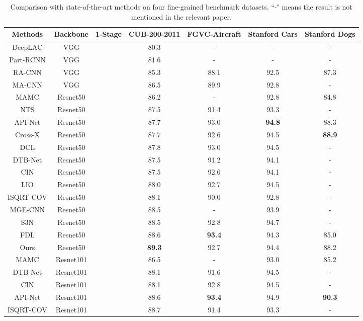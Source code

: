 \documentclass[conference]{IEEEtran}
\newcommand{\unchecked}{}
\begin{document}
	\begin{table*}
		\caption{Comparison with state-of-the-art methods on four fine-grained benchmark datasets. ``-" means the result is not mentioned in the relevant paper.}
		\label{table:COMP}
		\centering
		\begin{tabular}{ccccccc}
			\hline
			\textbf{Methods}       & \textbf{Backbone}     
			&\textbf{1-Stage} & \textbf{CUB-200-2011} & \textbf{FGVC-Aircraft} 
			& \textbf{Stanford Cars} & \textbf{Stanford Dogs} \\ \hline
			DeepLAC       & VGG   &\unchecked       & 80.3 & - &- &- \\
			Part-RCNN     & VGG   &\unchecked       & 81.6 & - &- &- \\
			RA-CNN        & VGG   &\unchecked     & 85.3   & 88.1 & 92.5 & 87.3 \\
			MA-CNN        & VGG   &\checked       & 86.5   & 89.9 & 92.8 & -  \\
			\hline
			MAMC          & Resnet50   &\checked       & 86.2   &- &92.8 & 84.8 \\
			NTS           & Resnet50   &\unchecked     & 87.5   & 91.4 & 93.3 &- \\
			API-Net       & Resnet50   &\checked       & 87.7   & 93.0 & \textbf{94.8} &88.3\\
			Cross-X       & Resnet50   &\checked       & 87.7   & 92.6 & 94.5 & \textbf{88.9}\\
			DCL           & Resnet50   &\checked       & 87.8   & 93.0 & 94.5 & -\\
			DTB-Net       & Resnet50   &\checked      & 87.5   & 91.2 & 94.1 & -\\
			CIN           & Resnet50   &\checked       & 87.5   & 92.6 & 94.1 & -\\
			LIO           & Resnet50   &\checked       & 88.0   & 92.7 & 94.5 & -\\
			ISQRT-COV     & Resnet50   &\checked       & 88.1   & 90.0 & 92.8 & - \\
			MGE-CNN       & Resnet50   &\unchecked     & 88.5   &-     & 93.9 & - \\
			S3N           & Resnet50   &\unchecked     & 88.5   & 92.8 & 94.7 &-  \\ 
			FDL          & Resnet50   &\unchecked  & 88.6   & \textbf{93.4} & 94.3 &85.0 \\
			Ours          &Resnet50 &\checked    & \textbf{89.3} & 92.7 & 94.4 & 88.2\\ \hline
			
			MAMC          & Resnet101   &\checked       & 86.5   &-  &93.0  &85.2\\
			DTB-Net       &Resnet101   &\checked       & 88.1   &91.6 &94.5 &-\\
			CIN           & Resnet101   &\checked       & 88.1   &92.8 &94.5 &-\\
			API-Net       & Resnet101   &\checked       & 88.6   &\textbf{93.4} &94.9 &\textbf{90.3}\\
			ISQRT-COV     & Resnet101   &\checked       & 88.7   &91.4 &93.3 &-\\
			

\end{tabular}
\end{table*}
\end{document}
